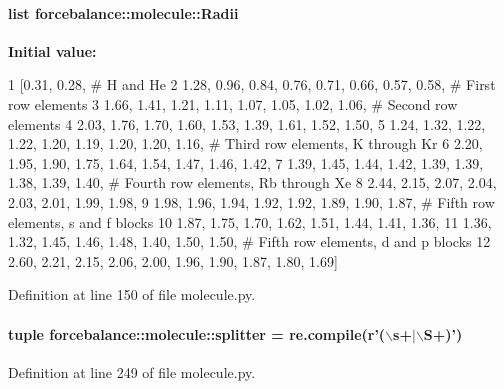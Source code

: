 \hypertarget{namespaceforcebalance_1_1molecule_ae100906fa209012ddf9d4b19ee69b0b7}{
\paragraph[{\-Radii}]{\setlength{\rightskip}{0pt plus 5cm}list {\bf forcebalance\-::molecule\-::\-Radii}}}\label{namespaceforcebalance_1_1molecule_ae100906fa209012ddf9d4b19ee69b0b7}
{\bfseries \-Initial value\-:}
\begin{DoxyCode}
1 [0.31, 0.28, # H and He
2          1.28, 0.96, 0.84, 0.76, 0.71, 0.66, 0.57, 0.58, # First row elements
3          1.66, 1.41, 1.21, 1.11, 1.07, 1.05, 1.02, 1.06, # Second row elements
4          2.03, 1.76, 1.70, 1.60, 1.53, 1.39, 1.61, 1.52, 1.50, 
5          1.24, 1.32, 1.22, 1.22, 1.20, 1.19, 1.20, 1.20, 1.16, # Third row
       elements, K through Kr
6          2.20, 1.95, 1.90, 1.75, 1.64, 1.54, 1.47, 1.46, 1.42, 
7          1.39, 1.45, 1.44, 1.42, 1.39, 1.39, 1.38, 1.39, 1.40, # Fourth row
       elements, Rb through Xe
8          2.44, 2.15, 2.07, 2.04, 2.03, 2.01, 1.99, 1.98, 
9          1.98, 1.96, 1.94, 1.92, 1.92, 1.89, 1.90, 1.87, # Fifth row elements,
       s and f blocks
10          1.87, 1.75, 1.70, 1.62, 1.51, 1.44, 1.41, 1.36, 
11          1.36, 1.32, 1.45, 1.46, 1.48, 1.40, 1.50, 1.50, # Fifth row elements,
       d and p blocks
12          2.60, 2.21, 2.15, 2.06, 2.00, 1.96, 1.90, 1.87, 1.80, 1.69]
\end{DoxyCode}


\-Definition at line 150 of file molecule.\-py.

\hypertarget{namespaceforcebalance_1_1molecule_a41b84501c57b5adca693580d4c27d099}{
\paragraph[{splitter}]{\setlength{\rightskip}{0pt plus 5cm}tuple {\bf forcebalance\-::molecule\-::splitter} = re.\-compile(r'($\backslash$s+$|$$\backslash$\-S+)')}}\label{namespaceforcebalance_1_1molecule_a41b84501c57b5adca693580d4c27d099}


\-Definition at line 249 of file molecule.\-py.

